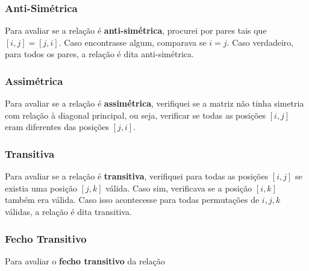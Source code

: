 \documentclass[12pt]{article}
\begin{document}
\subsubsection{Anti-Simétrica}
Para avaliar se a relação é \textbf{anti-simétrica}, procurei por pares tais que
$[i,j] = [j,i]$. Caso encontrasse algum, comparava se $i = j$. Caso verdadeiro,
para todos os pares, a relação é dita anti-simétrica.

\subsubsection{Assimétrica}
Para avaliar se a relação é \textbf{assimétrica}, verifiquei se a matriz não
tinha simetria com relação à diagonal principal, ou seja, verificar se todas as
posições $[i,j]$ eram diferentes das posições $[j,i]$.

\subsubsection{Transitiva}
Para avaliar se a relação é \textbf{transitiva}, verifiquei para todas as
posições $[i,j]$ se existia uma posição $[j,k]$ válida. Caso sim, verificava se
a posição $[i,k]$ também era válida. Caso isso acontecesse para todas
permutações de $i, j, k$ válidas, a relação é dita transitiva.

\subsubsection{Fecho Transitivo}
Para avaliar o \textbf{fecho transitivo} da relação
\end{document}
